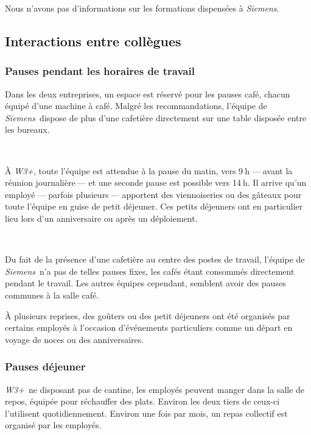 \documentclass[a4paper, oneside, 12pt]{article}
\def\www{\emph{W3+}}
\def\siemens{\emph{Siemens}}
\begin{document}
Nous n’avons pas d’informations sur les formations dispensées à \siemens.

\vfill

\subsection{Interactions entre collègues}

\subsubsection{Pauses pendant les horaires de travail}

Dans les deux entreprises, un espace est réservé pour les pauses café, chacun équipé d’une machine à café. Malgré les recommandations, l’équipe de \siemens\ dispose de plus d’une cafetière directement sur une table disposée entre les bureaux.

\ 

À \www, toute l’équipe est attendue à la pause du matin, vers 9$~$h —$~$avant la réunion journalière$~$— et une seconde pause est possible vers 14$~$h. Il arrive qu’un employé —$~$parfois plusieurs$~$— apportent des viennoiseries ou des gâteaux pour toute l’équipe en guise de petit déjeuner. Ces petits déjeuners ont en particulier lieu lors d’un anniversaire ou après un déploiement.

\ 

Du fait de la présence d’une cafetière au centre des postes de travail, l’équipe de \siemens\ n’a pas de telles pauses fixes, les cafés étant consommés directement pendant le travail. Les autres équipes cependant, semblent avoir des pauses communes à la salle café.

À plusieurs reprises, des goûters ou des petit déjeuners ont été organisés par certains employés à l’occasion d’événements particuliers comme un départ en voyage de noces ou des anniversaires.

\vfill

\newpage

\subsubsection{Pauses déjeuner}

\www\ ne disposant pas de cantine, les employés peuvent manger dans la salle de repos, équipée pour réchauffer des plats. Environ les deux tiers de ceux-ci l’utilisent quotidiennement. Environ une fois par mois, un repas collectif est organisé par les employés.
\end{document}
